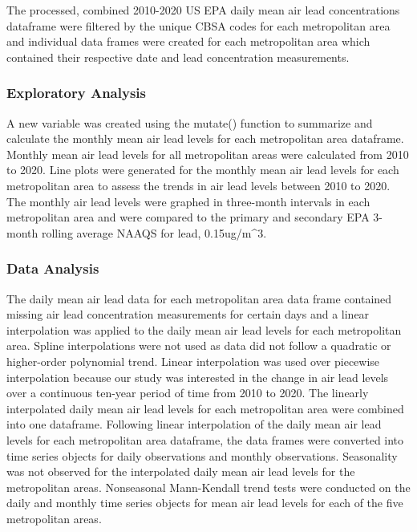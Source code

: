 \documentclass[
  12pt,
]{article}
\begin{document}
The processed, combined 2010-2020 US EPA daily mean air lead
concentrations dataframe were filtered by the unique CBSA codes for each
metropolitan area and individual data frames were created for each
metropolitan area which contained their respective date and lead
concentration measurements.

\hypertarget{exploratory-analysis}{%
\subsubsection{Exploratory Analysis}\label{exploratory-analysis}}

A new variable was created using the mutate() function to summarize and
calculate the monthly mean air lead levels for each metropolitan area
dataframe. Monthly mean air lead levels for all metropolitan areas were
calculated from 2010 to 2020. Line plots were generated for the monthly
mean air lead levels for each metropolitan area to assess the trends in
air lead levels between 2010 to 2020. The monthly air lead levels were
graphed in three-month intervals in each metropolitan area and were
compared to the primary and secondary EPA 3-month rolling average NAAQS
for lead, 0.15ug/m\^{}3.

\hypertarget{data-analysis}{%
\subsubsection{Data Analysis}\label{data-analysis}}

The daily mean air lead data for each metropolitan area data frame
contained missing air lead concentration measurements for certain days
and a linear interpolation was applied to the daily mean air lead levels
for each metropolitan area. Spline interpolations were not used as data
did not follow a quadratic or higher-order polynomial trend. Linear
interpolation was used over piecewise interpolation because our study
was interested in the change in air lead levels over a continuous
ten-year period of time from 2010 to 2020. The linearly interpolated
daily mean air lead levels for each metropolitan area were combined into
one dataframe. Following linear interpolation of the daily mean air lead
levels for each metropolitan area dataframe, the data frames were
converted into time series objects for daily observations and monthly
observations. Seasonality was not observed for the interpolated daily
mean air lead levels for the metropolitan areas. Nonseasonal
Mann-Kendall trend tests were conducted on the daily and monthly time
series objects for mean air lead levels for each of the five
metropolitan areas.
\end{document}
